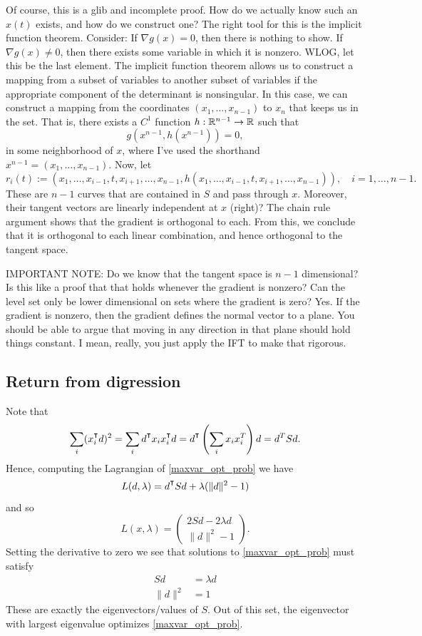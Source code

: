 Of course, this is a glib and incomplete proof. How do we actually know such an $x(t)$ exists, and how do we construct one? The right tool for this is the implicit function theorem. Consider: If $\nabla g(x) =0$, then there is nothing to show. If $\nabla g(x) \not = 0$, then there exists some variable in which it is nonzero. WLOG, let this be the last element. The implicit function theorem allows us to construct a mapping from a subset of variables to another subset of variables if the appropriate component of the determinant is nonsingular. In this case, we can construct a mapping from the coordinates $(x_1,\ldots, x_{n-1})$ to $x_n$ that keeps us in the set. That is, there exists a $C^1$ function $h:\mathbb{R}^{n-1}\to\mathbb{R}$ such that
$$
g(x^{n-1}, h(x^{n-1})) = 0,
$$
in some neighborhood of $x$, where I've used the shorthand $x^{n-1} = (x_1,\ldots,x_{n-1})$. Now, let
$$
r_i(t) := (x_1,\ldots, x_{i-1}, t, x_{i+1},\ldots, x_{n-1}, h(x_1,\ldots, x_{i-1}, t, x_{i+1},\ldots, x_{n-1})), \quad i=1,\ldots, n-1.
$$
These are $n-1$ curves that are contained in $S$ and pass through $x$. Moreover, their tangent vectors are linearly independent at $x$ (right)? The chain rule argument shows that the gradient is orthogonal to each. From this, we conclude that it is orthogonal to each linear combination, and hence orthogonal to the tangent space. 

IMPORTANT NOTE: Do we know that the tangent space is $n-1$ dimensional? Is this like a proof that that holds whenever the gradient is nonzero? Can the level set only be lower dimensional on sets where the gradient is zero? Yes. If the gradient is nonzero, then the gradient defines the normal vector to a plane. You should be able to argue that moving in any direction in that plane should hold things constant. I mean, really, you just apply the IFT to make that rigorous. 

\subsection{Return from digression}
Note that 
$$
 \sum_i (x_i^\T d)^2 = \sum_i d^\T x_i x_i^\T d = d^\T \left( \sum_i x_i x_i^T\right) d = d^T S d.
$$
Hence, computing the Lagrangian of \eqref{maxvar_opt_prob} we have
$$
L(d, \lambda) = d^\T S d + \lambda (\|d\|^2 - 1)
$$
and so
$$
L(x,\lambda) = 
\begin{pmatrix}
2Sd - 2\lambda d\\
\|d\|^2 - 1
\end{pmatrix}.
$$
Setting the derivative to zero we see that solutions to \eqref{maxvar_opt_prob} must satisfy
\begin{align}
Sd & = \lambda d\\
\|d\|^2 & = 1
\end{align}
These are exactly the eigenvectors/values of $S$. Out of this set, the eigenvector with largest eigenvalue optimizes \eqref{maxvar_opt_prob}. 

